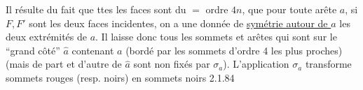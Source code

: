 Il résulte du fait que ttes les faces sont du $=$ ordre \(4n\), que pour  toute arête \(a\), si \(F,F'\) sont les deux faces incidentes, on a une donnée de \uline{symétrie autour de \(a\)}
  les deux extrémités de \(a\). Il laisse donc   tous les sommets et arêtes qui sont sur le ``grand côté'' \(\widehat a\) contenant \(a\) (bordé par les sommets d'ordre 4 les plus proches) (mais  de part et d'autre de \(\widehat a\) sont non fixés par \(\sigma_a\)). L'application \(\sigma_a\) transforme sommets rouges (resp. noirs) en sommets noirs
2.1.84

